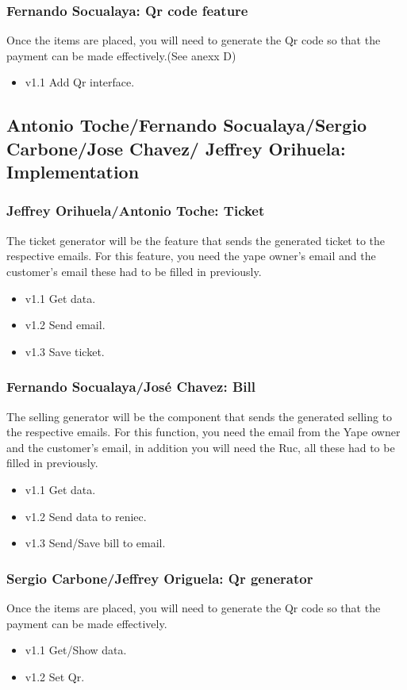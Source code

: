 \documentclass{article}
\begin{document}
\subsubsection{Fernando Socualaya: Qr code feature}
Once the items are placed, you will need to generate the Qr code so that the payment can be made effectively.(See anexx D)
\begin{itemize}
\item v1.1 Add Qr interface.
\end{itemize}

 \subsection{Antonio Toche/Fernando Socualaya/Sergio Carbone/Jose Chavez/ Jeffrey Orihuela: Implementation}
 \blindtext
\subsubsection{Jeffrey Orihuela/Antonio Toche: Ticket}
The ticket generator will be the feature that sends the generated ticket to the respective emails. For this feature, you need the yape owner's email and the customer's email these had to be filled in previously.
\begin{itemize}
\item v1.1 Get data.
\item v1.2 Send email.
\item v1.3 Save ticket.
\end{itemize}

\subsubsection{Fernando Socualaya/José Chavez: Bill}
The selling generator will be the component that sends the generated selling to the respective emails. For this function, you need the email from the Yape owner and the customer's email, in addition you will need the Ruc, all these had to be filled in previously.
\begin{itemize}
\item v1.1 Get data.
\item v1.2 Send data to reniec.
\item v1.3 Send/Save bill to email.
\end{itemize}

\subsubsection{Sergio Carbone/Jeffrey Origuela: Qr generator}
Once the items are placed, you will need to generate the Qr code so that the payment can be made effectively.
\begin{itemize}
\item v1.1 Get/Show data.
\item v1.2 Set Qr.
\end{itemize}
\end{document}
